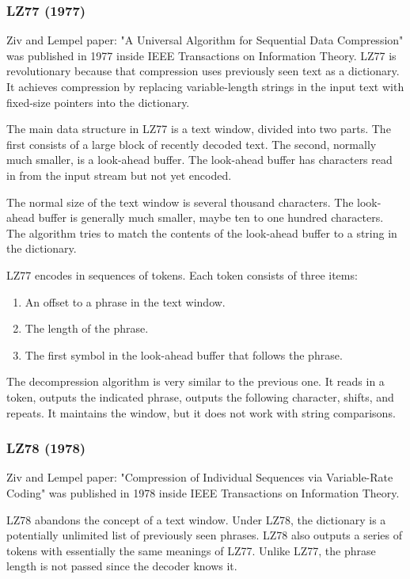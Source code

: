 \documentclass[12pt, a4paper]{report}
\begin{document}
\subsubsection{LZ77 (1977)}

Ziv and Lempel paper: "A Universal Algorithm for Sequential Data Compression" was published in 1977 inside IEEE Transactions on
Information Theory.
LZ77 is revolutionary because that compression uses previously seen text as a dictionary.
It achieves compression by replacing variable-length strings in the input text with fixed-size pointers into the dictionary.

The main data structure in LZ77 is a text window, divided into two parts.
The first consists of a large block of recently decoded text.
The second, normally much smaller, is a look-ahead buffer.
The look-ahead buffer has characters read in from the input stream but not yet encoded.

The normal size of the text window is several thousand characters.
The look-ahead buffer is generally much smaller, maybe ten to one hundred characters.
The algorithm tries to match the contents of the look-ahead buffer to a string in the dictionary.

LZ77 encodes in sequences of tokens.
Each token consists of three items:

\begin{enumerate}
  \item An offset to a phrase in the text window.
  \item The length of the phrase.
  \item The first symbol in the look-ahead buffer that follows the phrase.
\end{enumerate}

The decompression algorithm is very similar to the previous one.
It reads in a token, outputs the indicated phrase, outputs the following character, shifts, and repeats.
It maintains the window, but it does not work with string comparisons.

\subsubsection{LZ78 (1978)}

Ziv and Lempel paper: "Compression of Individual Sequences via Variable-Rate Coding" was published in 1978 inside IEEE
Transactions on Information Theory.

LZ78 abandons the concept of a text window.
Under LZ78, the dictionary is a potentially unlimited list of previously seen phrases.
LZ78 also outputs a series of tokens with essentially the same meanings of LZ77.
Unlike LZ77, the phrase length is not passed since the decoder knows it.
\end{document}

